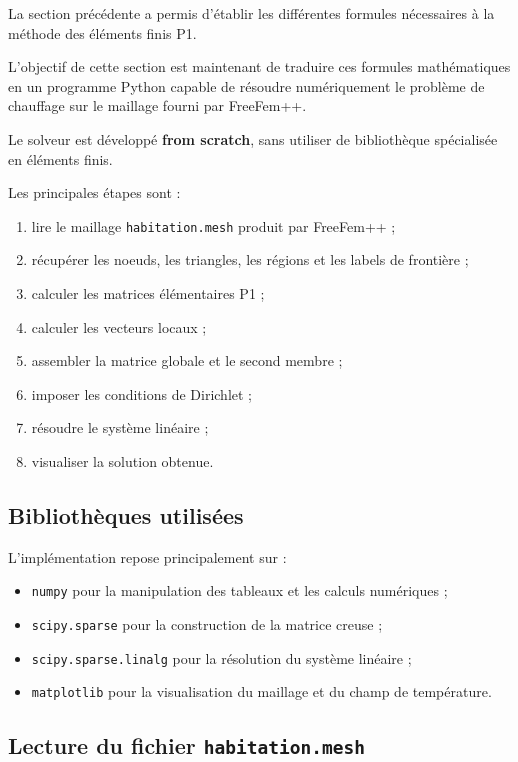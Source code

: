 \documentclass[12pt,a4paper]{article}
\begin{document}
	La section précédente a permis d'établir les différentes formules
	nécessaires à la méthode des éléments finis P1.
	
	L'objectif de cette section est maintenant de traduire ces formules
	mathématiques en un programme Python capable de résoudre
	numériquement le problème de chauffage sur le maillage fourni par
	FreeFem++.
	
	Le solveur est développé \textbf{from scratch}, sans utiliser de
	bibliothèque spécialisée en éléments finis.
	
	Les principales étapes sont :
	\begin{enumerate}
		\item lire le maillage \texttt{habitation.mesh} produit par FreeFem++ ;
		\item récupérer les noeuds, les triangles, les régions et les labels de frontière ;
		\item calculer les matrices élémentaires P1 ;
		\item calculer les vecteurs locaux ;
		\item assembler la matrice globale et le second membre ;
		\item imposer les conditions de Dirichlet ;
		\item résoudre le système linéaire ;
		\item visualiser la solution obtenue.
	\end{enumerate}
	
	\subsection{Bibliothèques utilisées}
	
	L'implémentation repose principalement sur :
	\begin{itemize}
		\item \texttt{numpy} pour la manipulation des tableaux et les
		calculs numériques ;
		\item \texttt{scipy.sparse} pour la construction de la matrice
		creuse ;
		\item \texttt{scipy.sparse.linalg} pour la résolution du système
		linéaire ;
		\item \texttt{matplotlib} pour la visualisation du maillage et du
		champ de température.
	\end{itemize}
	
	\subsection{Lecture du fichier \texttt{habitation.mesh}}
	
\end{document}
